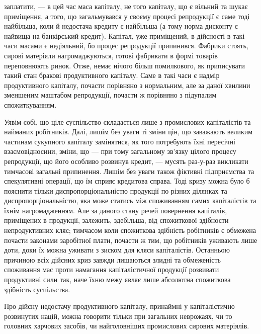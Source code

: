 \parcont{}  %
заплатити, — в цей час маса капіталу, не того капіталу, що є вільний та шукає
приміщення, а того, що загальмувався у своєму процесі репродукції є саме тоді
найбільша, коли й недостача кредиту є найбільша (а тому норма дисконту є найвища
на банкірський кредит). Капітал, уже приміщений, в дійсності в такі часи
масами є недіяльний, бо процес репродукції припинився. Фабрики стоять, сирові
матеріяли нагромаджуються, готові фабрикати в формі товарів переповнюють
ринок. Отже, немає нічого більш помилкового, як приписувати такий стан бракові
продуктивного капіталу. Саме в такі часи є надмір продуктивного капіталу,
почасти порівняно з нормальним, але за даної хвилини зменшеним маштабом
репродукції, почасти ж порівняно з підупалим спожиткуванням.

Уявім собі, що ціле суспільство складається лише з промислових капіталістів
та найманих робітників. Далі, лишім без уваги ті зміни цін, що заважають
великим частинам сукупного капіталу замінятися, як того потребують їхні
пересічні взаємовідносини, зміни, що — при тому загальному зв’язку цілого
процесу репродукції, що його особливо розвинув кредит, — мусять раз-у-раз
викликати тимчасові загальні припинення. Лишім без уваги також фіктивні
підприємства та спекулятивні операції, що їм сприяє кредитова справа. Тоді
кризу можна було б пояснити тільки диспропорціональністю продукції по різних
ділянках та диспропорціональністю, яка може статись між споживанням самих
капіталістів та їхнім нагромадженням. Але за даного стану речей повернення
капіталів, приміщених в продукції, залежить, здебільша, від спожиткової здібности
непродуктивних кляс; тимчасом коли спожиткова здібність робітників є
обмежена почасти законами заробітної плати, почасти ж тим, що робітників
уживають лише доти, доки їх можна уживати з зиском для кляси капіталістів.
Останньою причиною всіх дійсних криз завжди лишаються злидні та
обмеженість споживання мас проти намагання капіталістичної продукції розвивати
продуктивні сили так, наче їхню межу являє лише абсолютна спожиткова
здібність суспільства.

Про дійсну недостачу продуктивного капіталу, принаймні у капіталістично
розвинутих націй, можна говорити тільки при загальних неврожаях, чи то
головних харчових засобів, чи найголовніших промислових сирових матеріялів.

